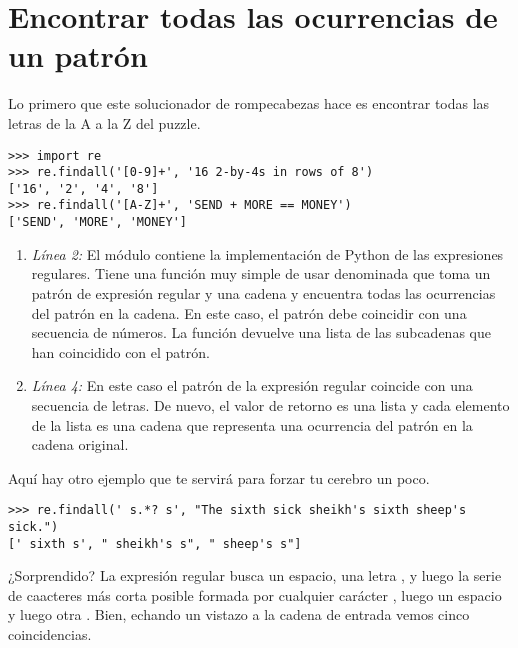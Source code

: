 \section{Encontrar todas las ocurrencias de un patrón}
Lo primero que este solucionador de rompecabezas hace es encontrar todas las letras de la A a la Z del puzzle.

\noindent\begin{minipage}{\textwidth}
\begin{lstlisting}[mathescape=True]
>>> import re 
>>> re.findall('[0-9]+', '16 2-by-4s in rows of 8')
['16', '2', '4', '8'] 
>>> re.findall('[A-Z]+', 'SEND + MORE == MONEY')
['SEND', 'MORE', 'MONEY']
\end{lstlisting}
\end{minipage}

\begin{enumerate}

\item \emph{Línea 2:} El módulo  contiene la implementación de Python de las expresiones regulares. Tiene una función muy simple de usar denominada  que toma un patrón de expresión regular y una cadena y encuentra todas las ocurrencias del patrón en la cadena. En este caso, el patrón debe coincidir con una secuencia de números. La función  devuelve una lista de las subcadenas que han coincidido con el patrón.

\item \emph{Línea 4:} En este caso el patrón de la expresión regular coincide con una secuencia de letras. De nuevo, el valor de retorno es una lista y cada elemento de la lista es una cadena que representa una ocurrencia del patrón en la cadena original.

\end{enumerate}


Aquí hay otro ejemplo que te servirá para forzar tu cerebro un poco.

\noindent\begin{minipage}{\textwidth}
\begin{lstlisting}[mathescape=True]
>>> re.findall(' s.*? s', "The sixth sick sheikh's sixth sheep's sick.")
[' sixth s', " sheikh's s", " sheep's s"]
\end{lstlisting}
\end{minipage}


¿Sorprendido? La expresión regular busca un espacio, una letra , y luego la serie de caacteres más corta posible formada por cualquier carácter , luego un espacio y luego otra . Bien, echando un vistazo a la cadena de entrada vemos cinco coincidencias.

